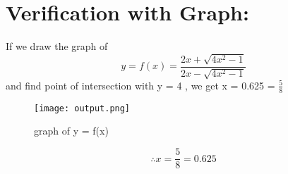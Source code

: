 \documentclass[twocolumn]{article}
\begin{document}
\section*{Verification with Graph:}
If we draw the graph of 
\begin{equation*} 
y = f(x) = \frac{2x+\sqrt{4x^2-1}}{2x-\sqrt{4x^2-1}}
\end{equation*}
 and find point of intersection with y = 4  , we get  x = 0.625 = $\frac{5}{8}$
\begin{figure}[h]
\texttt{[image: output.png]}
\caption{graph of y = f(x)}
\end{figure}
\begin{equation*}
\therefore x = \frac{5}{8} = 0.625 
\end{equation*}
\end{document}
